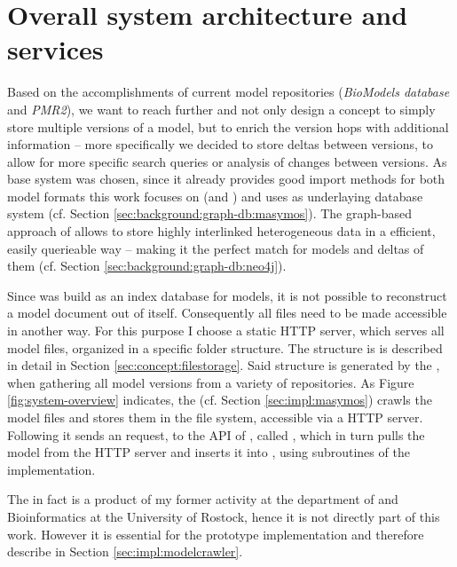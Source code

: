 \label{sec:concept}

\section{Overall system architecture and services}
\label{sec:concept:sysarchitecture}

Based on the accomplishments of current model repositories (\emph{BioModels database} and \emph{PMR2}), we want to reach further and not only design a concept to simply store multiple versions of a model, but to enrich the version hops with additional information -- more specifically we decided to store deltas between versions, to allow for more specific search queries or analysis of changes between versions.
As base system \masymos was chosen, since it already provides good import methods for both model formats this work focuses on (\sbml and \cellml) and uses \neoj as underlaying database system (cf. Section \ref{sec:background:graph-db:masymos}). The graph-based approach of \neoj allows to store highly interlinked heterogeneous data in a efficient, easily querieable way -- making it the perfect match for \sysbio models and deltas of them (cf. Section \ref{sec:background:graph-db:neo4j}).  

Since \masymos was build as an index database for models, it is not possible to reconstruct a \xml model document out of \masymos itself. Consequently all files need to be made accessible in another way. For this purpose I choose a static HTTP server, which serves all model files, organized in a specific folder structure. The structure is is described in detail in Section \ref{sec:concept:filestorage}.
Said structure is generated by the \modelcrawler, when gathering all model versions from a variety of repositories. As Figure \ref{fig:system-overview} indicates, the \modelcrawler (cf. Section \ref{sec:impl:masymos}) crawls the model files and stores them in the file system, accessible via a HTTP server. Following it sends an request, to the \rest API of \masymos, called \morre, which in turn pulls the model from the HTTP server and inserts it into \neoj, using subroutines of the \masymos implementation.

The \modelcrawler in fact is a product of my former activity at the department of \sysbio and Bioinformatics at the University of Rostock, hence it is not directly part of this work. However it is essential for the prototype implementation and therefore describe in Section \ref{sec:impl:modelcrawler}.


